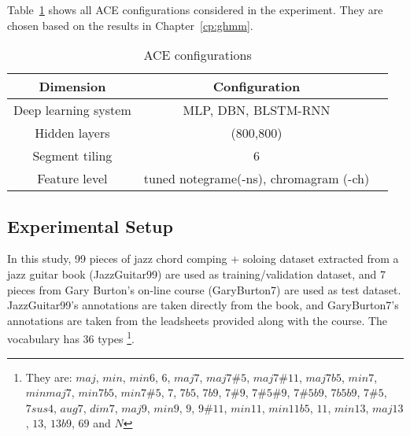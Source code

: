 Table~\ref{tab:5-aceconfig} shows all ACE configurations considered in the experiment. They are chosen based on the results in Chapter~\ref{cp:ghmm}.
\begin{table}
\centering
\footnotesize
\begin{tabular}{|c|c|c|} \hline
Dimension & Configuration \\ \hline
Deep learning system & MLP, DBN, BLSTM-RNN\\ \hline
Hidden layers & (800,800)\\ \hline
Segment tiling & 6\\ \hline
Feature level & tuned notegrame(-ns), chromagram (-ch) \\ \hline
\end{tabular}
\caption{ACE configurations}
\label{tab:5-aceconfig}
\end{table}

\subsection{Experimental Setup}
In this study, 99 pieces of jazz chord comping + soloing dataset extracted from a jazz guitar book \cite{jazzguitarbook} (JazzGuitar99) are used as training/validation dataset, and 7 pieces from Gary Burton's on-line course \cite{garyburtoncourse} (GaryBurton7) are used as test dataset. JazzGuitar99's annotations are taken directly from the book, and GaryBurton7's annotations are taken from the leadsheets provided along with the course. The vocabulary has 36 types \footnote{They are: $maj$, $min$, $min6$, $6$, $maj7$, $maj7\#5$, $maj7\#11$, $maj7b5$, $min7$, $minmaj7$, $min7b5$, $min7\#5$, $7$, $7b5$, $7b9$, $7\#9$, $7\#5\#9$, $7\#5b9$, $7b5b9$, $7\#5$, $7sus4$, $aug7$, $dim7$, $ maj9$, $min9$, $9$, $9\#11$, $min11$, $min11b5$, $11$, $min13$, $maj13$, $13$, $13b9$, $69$ and $N$}.


